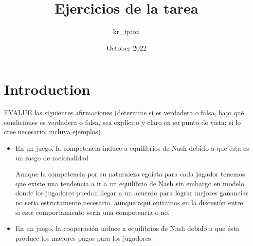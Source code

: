 \documentclass{article}
\title{Ejercicios de la tarea}
\author{kr\_ipton }
\date{October 2022}
\begin{document}
\maketitle

\section{Introduction}
EVALUE las siguientes afirmaciones (determine si es verdadera o falsa, bajo qué condiciones
es verdadera o falsa, sea explícito y claro en su punto de vista; si lo cree necesario, incluya ejemplos)

\begin{itemize}
    \item En un juego, la competencia induce a equilibrios de Nash debido a que ésta es un rasgo
de racionalidad
    
        Aunque la competencia por su naturaleza egoísta para cada jugador tenemos que existe una tendencia a ir a un equilibrio de Nash sin embargo en modelo donde los jugadores puedan llegar a un acuerdo para lograr mejores ganancias no seria estrictamente necesario, aunque aquí entramos en la discusión entre si este comportamiento seria una competencia o no.
    \item En un juego, la cooperación induce a equilibrios de Nash debido a que ésta produce los mayores pagos para los jugadores.
        

\end{itemize}
\end{document}
